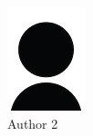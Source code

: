 \begin{figure}
\begin{subfigure}[b]{0.2\textwidth}
        \includegraphics[width=\textwidth]{figs/author}
        \caption{Author 2}
        \label{fig:c1:auth2}
    \end{subfigure}
    \hfill
    \begin{subfigure}[b]{0.2\textwidth}
        \centering

\end{subfigure}
\end{figure}
